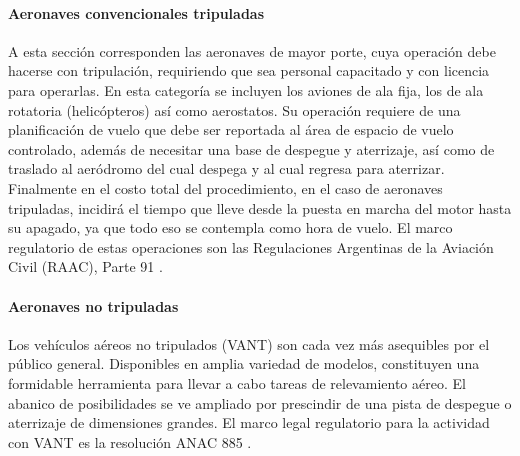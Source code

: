 \paragraph{Aeronaves convencionales tripuladas}
A esta sección corresponden las aeronaves de mayor porte, cuya operación debe hacerse con tripulación, requiriendo que sea personal capacitado y con licencia para operarlas. En esta categoría se incluyen los aviones de ala fija, los de ala rotatoria (helicópteros) así como aerostatos. Su operación requiere de una planificación de vuelo que debe ser reportada al área de espacio de vuelo controlado, además de necesitar una base de despegue y aterrizaje, así como de traslado al aeródromo del cual despega y al cual regresa para aterrizar.   Finalmente en el costo total del procedimiento, en el caso de aeronaves tripuladas, incidirá el tiempo que lleve desde la puesta en marcha del motor hasta su apagado, ya que todo eso se contempla como hora de vuelo.
El marco regulatorio de estas operaciones son las Regulaciones Argentinas de la Aviación Civil (RAAC), Parte 91 \cite{noauthor_infoleg_nodate-1}.


\paragraph{Aeronaves no tripuladas}
Los vehículos aéreos no tripulados (VANT) son cada vez más asequibles por el público general. Disponibles en amplia variedad de modelos, constituyen una formidable herramienta para llevar a cabo tareas de relevamiento aéreo. El abanico de posibilidades se ve ampliado por prescindir de una pista de despegue o aterrizaje de dimensiones grandes. El marco legal regulatorio para la actividad con VANT es la resolución ANAC 885 \cite{noauthor_infoleg_nodate}.

